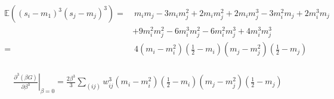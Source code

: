 \documentclass[../report/report.tex]{subfiles}
\begin{document}
\begin{align}
\begin{split}
\mathbb{E}((s_i-m_1)^3(s_j-m_j)^3)= & ~m_i m_j -3m_i m_j^2 +2 m_i m_j^2 + 2m_im_j^3 -3 m_i^2 m_j 
 + 2 m_i^3 m_j \\
 & + 9 m_i^2m_j^2 - 6m_i^3 m_j^2 - 6 m_i^2 m_j^3 + 4m_i^3m_j^3 
 \\
  = &~ 4(m_i - m_i^2)(\frac{1}{2} - m_i)(m_j - m_j^2)(\frac{1}{2} - m_j)
 \end{split}
\end{align}

\begin{align*}
\begin{split}
\left. \frac{\partial^3 (\beta G)}{\partial \beta^3}\right|_{\beta = 0} = \frac{2\beta^3}{3} \sum_{(ij)} w_{ij}^3 (m_i - m_i^2)(\frac{1}{2} - m_i)(m_j - m_j^2)(\frac{1}{2} - m_j)
\end{split}
\end{align*}
\end{document}
